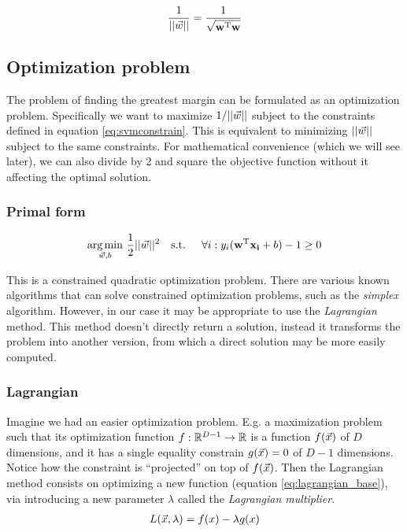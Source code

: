 \begin{align}
    \frac{1}{||\vec{w}||} = \frac{1}{\sqrt{\mathbf{w}^{\text{T}} \mathbf{w}}}
\end{align}

\subsection{Optimization problem}

The problem of finding the greatest margin can be formulated as an optimization problem. Specifically we want to maximize $1/||\vec{w}||$ subject to the constraints defined in equation \ref{eq:svmconstrain}. This is equivalent to minimizing $||\vec{w}||$ subject to the same constraints. For mathematical convenience (which we will see later), we can also divide by 2 and square the objective function without it affecting the optimal solution.

\subsubsection*{Primal form}
\begin{align}\label{eq:svm_primal} 
    \underset{\vec{w}, b}{\text{arg} \min}\ \frac{1}{2} ||\vec{w}||^2 \text{\quad s.t. \quad} \forall i : y_i (\mathbf{w}^{\text{T}} \mathbf{x_i} + b) - 1 \ge 0
\end{align}

This is a constrained quadratic optimization problem. There are various known algorithms that can solve constrained optimization problems, such as the \emph{simplex} algorithm. However, in our case it may be appropriate to use the \emph{Lagrangian} method. This method doesn't directly return a solution, instead it transforms the problem into another version, from which a direct solution may be more easily computed.

\subsubsection*{Lagrangian}

Imagine we had an easier optimization problem. E.g. a maximization pro\-blem such that its optimization function $f : \mathbb{R}^{D-1} \rightarrow \mathbb{R}$ is a function $f(\vec{x})$ of $D$ dimensions, and it has a single equality constrain $g(\vec{x}) = 0$ of $D - 1$ dimensions. Notice how the constraint is “projected” on top of $f(\vec{x})$. Then the Lagrangian method consists on optimizing a new function (equation \ref{eq:lagrangian_base}), via introducing a new pa\-ram\-e\-ter $\lambda$ called the \emph{Lagrangian multiplier}. 
\begin{align}\label{eq:lagrangian_base} 
    L(\vec{x}, \lambda) = f(x) - \lambda g(x)
\end{align}

